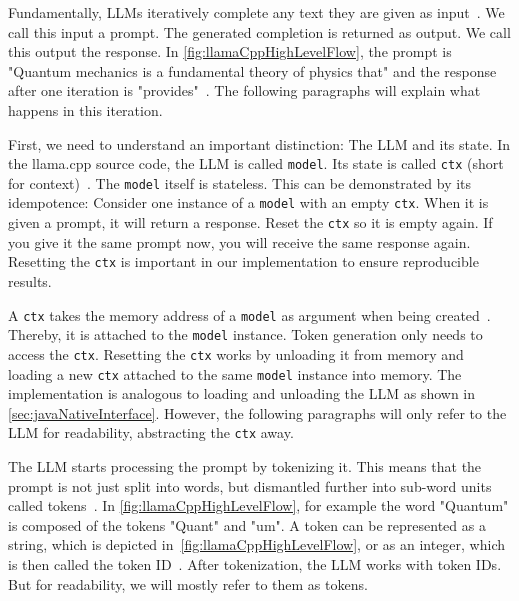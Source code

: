 Fundamentally, \glspl{LLM} iteratively complete any text they are given as input~\cite{mallisUnderstandingHowLLM2023}. We call this input a prompt. The generated completion is returned as output. We call this output the response. In \cref{fig:llamaCppHighLevelFlow}, the prompt is "Quantum mechanics is a fundamental theory of physics that" and the response after one iteration is "provides"~\cite{mallisUnderstandingHowLLM2023}. The following paragraphs will explain what happens in this iteration.

First, we need to understand an important distinction: The \gls{LLM} and its state. In the llama.cpp source code, the \gls{LLM} is called \lstinline|model|. Its state is called \lstinline|ctx| (short for context)~\cite{gerganovGgerganovLlamacpp2024}. The \lstinline|model| itself is stateless. This can be demonstrated by its idempotence: Consider one instance of a \lstinline|model| with an empty \lstinline|ctx|. When it is given a prompt, it will return a response. Reset the \lstinline|ctx| so it is empty again. If you give it the same prompt now, you will receive the same response again. Resetting the \lstinline|ctx| is important in our implementation to ensure reproducible results.

A \lstinline|ctx| takes the memory address of a \lstinline|model| as argument when being created~\cite{gerganovGgerganovLlamacpp2024}. Thereby, it is attached to the \lstinline|model| instance. Token generation only needs to access the \lstinline|ctx|. Resetting the \lstinline|ctx| works by unloading it from memory and loading a new \lstinline|ctx| attached to the same \lstinline|model| instance into memory. The implementation is analogous to loading and unloading the \gls{LLM} as shown in \cref{sec:javaNativeInterface}. However, the following paragraphs will only refer to the \gls{LLM} for readability, abstracting the \lstinline|ctx| away.

The \gls{LLM} starts processing the prompt by tokenizing it. This means that the prompt is not just split into words, but dismantled further into sub-word units called tokens~\cite{mallisUnderstandingHowLLM2023}. In \cref{fig:llamaCppHighLevelFlow}, for example the word "Quantum" is composed of the tokens "Quant" and "um". A token can be represented as a string, which is depicted in~\cref{fig:llamaCppHighLevelFlow}, or as an integer, which is then called the token ID~\cite{mallisUnderstandingHowLLM2023}. After tokenization, the \gls{LLM} works with token IDs. But for readability, we will mostly refer to them as tokens.

